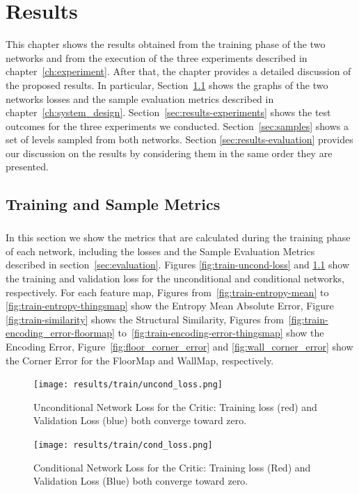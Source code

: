 \chapter{Results}
\label{sec:results}
This chapter shows the results obtained from the training phase of the two networks and from the execution of the three experiments described in chapter~\ref{ch:experiment}. After that, the chapter provides a detailed discussion of the proposed results. In particular, Section~\ref{sec:results-training} shows the graphs of the two networks losses and the sample evaluation metrics described in chapter~\ref{ch:system_design}. Section~\ref{sec:results-experiments} shows the test outcomes for the three experiments we conducted. Section~\ref{sec:samples} shows a set of levels sampled from both networks. Section \ref{sec:results-evaluation} provides our discussion on the results by considering them in the same order they are presented. 

\section{Training and Sample Metrics}
\label{sec:results-training}
\paragraph{} In this section we show the metrics that are calculated during the training phase of each network, including the losses and the Sample Evaluation Metrics described in section~\ref{sec:evaluation}. Figures \ref{fig:train-uncond-loss} and \ref{fig:train-cond-loss} show the training and validation loss for the unconditional and conditional networks, respectively. For each feature map, Figures from~\ref{fig:train-entropy-mean} to \ref{fig:train-entropy-thingsmap} show the Entropy Mean Absolute Error, Figure \ref{fig:train-similarity} shows the Structural Similarity, Figures from~\ref{fig:train-encoding_error-floormap} to~\ref{fig:train-encoding-error-thingsmap} show the Encoding Error, Figure~\ref{fig:floor_corner_error} and \ref{fig:wall_corner_error} show the Corner Error for the FloorMap and WallMap, respectively.

\begin{figure}[!htb] 
	\begin{minipage}[b]{0.9\linewidth}
		\centering
		\texttt{[image: results/train/uncond\_loss.png]} 
		\caption[Unconditional Network Loss]{Unconditional Network Loss for the Critic: Training loss (red) and Validation Loss (blue) both converge toward zero.}
		\label{fig:train-uncond-loss}
	\end{minipage}
	
	\begin{minipage}[b]{0.9\linewidth}
	\centering
	\texttt{[image: results/train/cond\_loss.png]} 
	\caption[Conditional Network Loss]{Conditional Network Loss for the Critic: Training loss (Red) and Validation Loss (Blue) both converge toward zero.}
	\label{fig:train-cond-loss}
\end{minipage}
\end{figure}

